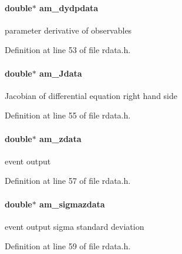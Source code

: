 \paragraph[{am\+\_\+dydpdata}]{\setlength{\rightskip}{0pt plus 5cm}double$\ast$ am\+\_\+dydpdata}\label{struct_return_data_a57a7eb2085d8ed5bb6c62331a2aa3af5}
parameter derivative of observables 

Definition at line 53 of file rdata.\+h.

\hypertarget{struct_return_data_a82d71415ca06c969ebd22a02e4789b1d}{}
\paragraph[{am\+\_\+\+Jdata}]{\setlength{\rightskip}{0pt plus 5cm}double$\ast$ am\+\_\+\+Jdata}\label{struct_return_data_a82d71415ca06c969ebd22a02e4789b1d}
Jacobian of differential equation right hand side 

Definition at line 55 of file rdata.\+h.

\hypertarget{struct_return_data_ab9982c7bbb81e3d54ab0a2f8b6e1ccec}{}
\paragraph[{am\+\_\+zdata}]{\setlength{\rightskip}{0pt plus 5cm}double$\ast$ am\+\_\+zdata}\label{struct_return_data_ab9982c7bbb81e3d54ab0a2f8b6e1ccec}
event output 

Definition at line 57 of file rdata.\+h.

\hypertarget{struct_return_data_a66bdea39e20521b851fedec7fca7a30b}{}
\paragraph[{am\+\_\+sigmazdata}]{\setlength{\rightskip}{0pt plus 5cm}double$\ast$ am\+\_\+sigmazdata}\label{struct_return_data_a66bdea39e20521b851fedec7fca7a30b}
event output sigma standard deviation 

Definition at line 59 of file rdata.\+h.

\hypertarget{struct_return_data_a8191e336c3631c7e32882e1ce560f953}{}
